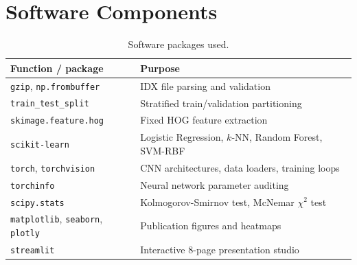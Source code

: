 \documentclass[conference]{IEEEtran}
\begin{document}
\appendices
\section{Software Components}
\begin{table}[h]\centering\caption{Software packages used.}
\begin{tabular}{@{}p{}p{}@{}}\toprule
Function / package & Purpose\\\midrule
\texttt{gzip}, \texttt{np.frombuffer} & IDX file parsing and validation\\
\texttt{train\_test\_split} & Stratified train/validation partitioning\\
\texttt{skimage.feature.hog} & Fixed HOG feature extraction\\
\texttt{scikit-learn} & Logistic Regression, $k$-NN, Random Forest, SVM-RBF\\
\texttt{torch}, \texttt{torchvision} & CNN architectures, data loaders, training loops\\
\texttt{torchinfo} & Neural network parameter auditing\\
\texttt{scipy.stats} & Kolmogorov-Smirnov test, McNemar $\chi^2$ test\\
\texttt{matplotlib}, \texttt{seaborn}, \texttt{plotly} & Publication figures and heatmaps\\
\texttt{streamlit} & Interactive 8-page presentation studio\\\bottomrule
\end{tabular}\end{table}
\end{document}
